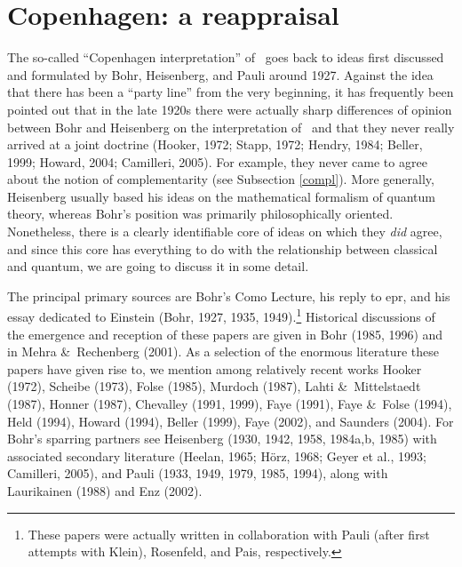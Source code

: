 \documentclass[12pt,titlepage]{article}
\newcommand{\epr}{{\sc epr}}
\begin{document}
 \section{Copenhagen: a reappraisal}\label{S3}\setcounter{equation}{0}
The  so-called ``Copenhagen interpretation'' of \qm\ goes back to ideas first discussed and formulated by Bohr, Heisenberg, and Pauli around 1927. 
Against the idea that there has been a ``party line'' from the very beginning, 
it has frequently been pointed out that in the late 1920s there were actually sharp differences of opinion between Bohr and Heisenberg on the interpretation of \qm\ and that they never really arrived at a joint doctrine  (Hooker, 1972; Stapp, 1972;  Hendry, 1984;   Beller, 1999;   Howard, 2004; Camilleri, 2005). For example, they never came to agree about the notion of complementarity (see Subsection \ref{compl}). More generally,  Heisenberg usually based  his ideas on the mathematical formalism of quantum theory, whereas Bohr's position was primarily philosophically oriented. Nonetheless, there is a clearly identifiable core of ideas on which they {\it did} agree, and since this core has everything to do with the relationship between classical and quantum, we are going to discuss it in some detail. 

The principal  primary sources are Bohr's Como Lecture, his reply to \epr, and his essay dedicated to Einstein (Bohr, 1927,  1935, 1949).\footnote{ 
These papers were actually written in collaboration with Pauli (after first attempts with Klein), Rosenfeld, and Pais, respectively.}  Historical discussions of the emergence and reception of these papers are given in Bohr (1985, 1996) and in Mehra \&\ Rechenberg (2001).  As a selection of the enormous literature these papers have given rise to, we mention 
among relatively recent works Hooker (1972), Scheibe (1973), Folse (1985), Murdoch (1987), Lahti \&\ Mittelstaedt (1987), Honner (1987), Chevalley (1991, 1999), Faye (1991), Faye \&\ Folse (1994), Held (1994),  Howard (1994),  Beller (1999), Faye (2002), and Saunders (2004).
For Bohr's sparring partners  see Heisenberg (1930, 1942, 1958, 1984a,b, 1985) with associated secondary literature (Heelan, 1965; H\"{o}rz, 1968; Geyer  
et al., 1993; Camilleri, 2005),  and Pauli (1933, 1949, 1979, 1985, 1994), along with Laurikainen (1988) and Enz (2002). 
  
\end{document}
